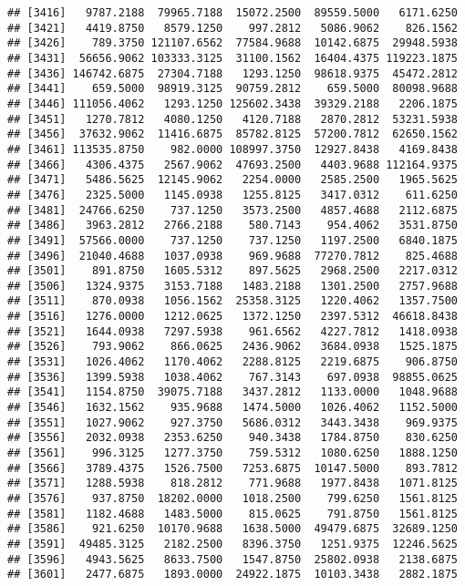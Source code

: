 \documentclass[]{article}
\begin{document}
\begin{verbatim}
## [3416]   9787.2188  79965.7188  15072.2500  89559.5000   6171.6250
## [3421]   4419.8750   8579.1250    997.2812   5086.9062    826.1562
## [3426]    789.3750 121107.6562  77584.9688  10142.6875  29948.5938
## [3431]  56656.9062 103333.3125  31100.1562  16404.4375 119223.1875
## [3436] 146742.6875  27304.7188   1293.1250  98618.9375  45472.2812
## [3441]    659.5000  98919.3125  90759.2812    659.5000  80098.9688
## [3446] 111056.4062   1293.1250 125602.3438  39329.2188   2206.1875
## [3451]   1270.7812   4080.1250   4120.7188   2870.2812  53231.5938
## [3456]  37632.9062  11416.6875  85782.8125  57200.7812  62650.1562
## [3461] 113535.8750    982.0000 108997.3750  12927.8438   4169.8438
## [3466]   4306.4375   2567.9062  47693.2500   4403.9688 112164.9375
## [3471]   5486.5625  12145.9062   2254.0000   2585.2500   1965.5625
## [3476]   2325.5000   1145.0938   1255.8125   3417.0312    611.6250
## [3481]  24766.6250    737.1250   3573.2500   4857.4688   2112.6875
## [3486]   3963.2812   2766.2188    580.7143    954.4062   3531.8750
## [3491]  57566.0000    737.1250    737.1250   1197.2500   6840.1875
## [3496]  21040.4688   1037.0938    969.9688  77270.7812    825.4688
## [3501]    891.8750   1605.5312    897.5625   2968.2500   2217.0312
## [3506]   1324.9375   3153.7188   1483.2188   1301.2500   2757.9688
## [3511]    870.0938   1056.1562  25358.3125   1220.4062   1357.7500
## [3516]   1276.0000   1212.0625   1372.1250   2397.5312  46618.8438
## [3521]   1644.0938   7297.5938    961.6562   4227.7812   1418.0938
## [3526]    793.9062    866.0625   2436.9062   3684.0938   1525.1875
## [3531]   1026.4062   1170.4062   2288.8125   2219.6875    906.8750
## [3536]   1399.5938   1038.4062    767.3143    697.0938  98855.0625
## [3541]   1154.8750  39075.7188   3437.2812   1133.0000   1048.9688
## [3546]   1632.1562    935.9688   1474.5000   1026.4062   1152.5000
## [3551]   1027.9062    927.3750   5686.0312   3443.3438    969.9375
## [3556]   2032.0938   2353.6250    940.3438   1784.8750    830.6250
## [3561]    996.3125   1277.3750    759.5312   1080.6250   1888.1250
## [3566]   3789.4375   1526.7500   7253.6875  10147.5000    893.7812
## [3571]   1288.5938    818.2812    771.9688   1977.8438   1071.8125
## [3576]    937.8750  18202.0000   1018.2500    799.6250   1561.8125
## [3581]   1182.4688   1483.5000    815.0625    791.8750   1561.8125
## [3586]    921.6250  10170.9688   1638.5000  49479.6875  32689.1250
## [3591]  49485.3125   2182.2500   8396.3750   1251.9375  12246.5625
## [3596]   4943.5625   8633.7500   1547.8750  25802.0938   2138.6875
## [3601]   2477.6875   1893.0000  24922.1875  10103.3438   2882.1875

\end{verbatim}
\end{document}
